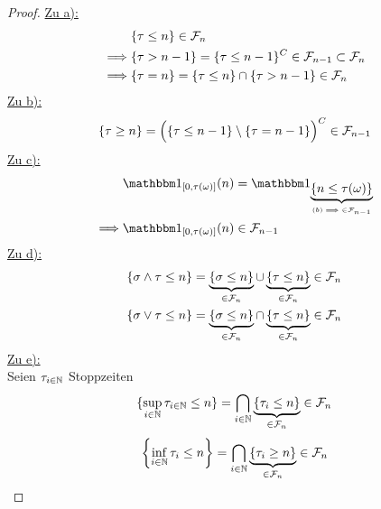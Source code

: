 \documentclass[12pt,a4paper]{article}
\begin{document}
\begin{proof}
\underline{Zu a):}\\
\begin{align*}
	&\{\tau \leq n\} \in \mathcal{F}_n \\
	\implies & \{\tau > n-1\} = \{\tau \leq n-1\}^C \in \mathcal{F}_{n-1} \subset \mathcal{F}_n \\
	\implies & \{\tau = n\} = \{\tau \leq n\} \cap \{\tau > n-1\} \in \mathcal{F}_n
	\end{align*}
\underline{Zu b):}\\
\begin{align*}
	\{\tau \geq n \} = \Big(\{\tau \leq n-1 \} \setminus \{\tau = n-1 \} \Big)^C \in \mathcal{F}_{n-1}
\end{align*}
\underline{Zu c):}\\
\begin{align*}
	&\indi_{[0,\tau(\omega)]}(n)=\indi_{\underbrace{\{n\leq \tau(\omega)\}}_{(b) \implies \in\F_{n-1}}} \\
	\implies &\indi_{[0,\tau(\omega)]}(n) \in \F_{n-1}
\end{align*}
\underline{Zu d):}\\
\begin{align*}
	&\{\sigma \wedge \tau \leq n \} = \underbrace{\{\sigma \leq n\}}_{\in \mathcal{F}_n} \cup \underbrace{\{\tau \leq n\}}_{\in\mathcal{F}_n} \in \mathcal{F}_n \\
	&\{\sigma \vee \tau \leq n \} = \underbrace{\{\sigma \leq n\}}_{\in \mathcal{F}_n} \cap \underbrace{\{\tau \leq n\}}_{\in\mathcal{F}_n} \in \mathcal{F}_n
\end{align*}
\underline{Zu e):}\\
Seien $\tau_{i\in\mathbb{N}}$ Stoppzeiten
\begin{align*}
	\{\sup_{i\in\mathbb{N}} \tau_{i\in\mathbb{N}} \leq n\} = \bigcap_{i\in\mathbb{N}}\underbrace{\{\tau_i \leq n\}}_{\in\mathcal{F}_n} \in \mathcal{F}_n
\end{align*}
\begin{align*}
\left\lbrace\inf_{i\in\mathbb{N}} \tau_{i} \leq n\right\rbrace = \bigcap_{i\in\mathbb{N}}\underbrace{\{\tau_i \geq n\}}_{\in\mathcal{F}_n} \in \mathcal{F}_n
\end{align*}

\end{proof}
\end{document}
